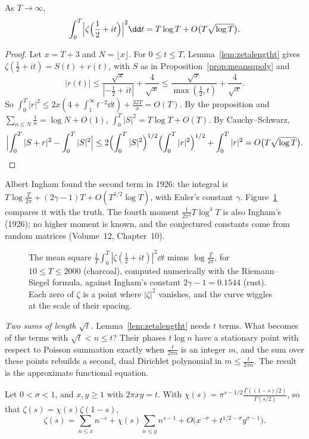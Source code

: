 \begin{theorem}\label{thm:hardylittlewood}
As $T\to\infty$,
\[
\int_0^T\Bigl|\zeta\Bigl(\frac12+it\Bigr)\Bigr|^2\dd t=T\log T+O\bigl(T\sqrt{\log T}\bigr).
\]
\end{theorem}
\begin{proof}
Let $x=T+3$ and $N=\lfloor x\rfloor$. For $0\le t\le T$, Lemma~\ref{lem:zetalengtht} gives $\zeta(\frac12+it)=S(t)+r(t)$, with $S$ as in Proposition~\ref{prop:meansqpoly} and
\[
|r(t)|\le\frac{\sqrt x}{|{-\frac12}+it|}+\frac4{\sqrt x}\le\frac{\sqrt x}{\max(\frac12,t)}+\frac4{\sqrt x}.
\]
So $\int_0^T|r|^2\le2x(4+\int_1^\infty t^{-2}\dd t)+\frac{32T}x=O(T)$. By the proposition and $\sum_{n\le N}\frac1n=\log N+O(1)$, $\int_0^T|S|^2=T\log T+O(T)$. By Cauchy--Schwarz,
\[
\Bigl|\int_0^T|S+r|^2-\int_0^T|S|^2\Bigr|\le2\Bigl(\int_0^T|S|^2\Bigr)^{1/2}\Bigl(\int_0^T|r|^2\Bigr)^{1/2}+\int_0^T|r|^2=O\bigl(T\sqrt{\log T}\bigr).
\]
\end{proof}

Albert Ingham found the second term in 1926: the integral is $T\log\frac T{2\pi}+(2\gamma-1)T+O(T^{1/2}\log T)$, with Euler's constant $\gamma$. Figure~\ref{fig:meansq} compares it with the truth. The fourth moment $\frac1{2\pi^2}T\log^4T$ is also Ingham's (1926); no higher moment is known, and the conjectured constants come from random matrices (Volume~12, Chapter~10).

\begin{figure}[ht]
\centering
{}
\caption{The mean square $\frac1T\int_0^T|\zeta(\frac12+it)|^2\dd t$ minus $\log\frac T{2\pi}$, for $10\le T\le2000$ (charcoal), computed numerically with the Riemann--Siegel formula, against Ingham's constant $2\gamma-1=0.1544$ (rust). Each zero of $\zeta$ is a point where $|\zeta|^2$ vanishes, and the curve wiggles at the scale of their spacing.}
\label{fig:meansq}
\end{figure}

\emph{Two sums of length $\sqrt t$.} Lemma~\ref{lem:zetalengtht} needs $t$ terms. What becomes of the terms with $\sqrt t<n\le t$? Their phases $t\log n$ have a stationary point with respect to Poisson summation exactly when $\frac t{2\pi n}$ is an integer $m$, and the sum over these points rebuilds a second, dual Dirichlet polynomial in $m\le\frac t{2\pi n}$. The result is the approximate functional equation.

\begin{theorem}\label{thm:afe}
Let $0<\sigma<1$, and $x,y\ge1$ with $2\pi xy=t$. With $\chi(s)=\pi^{s-1/2}\frac{\Gamma((1-s)/2)}{\Gamma(s/2)}$, so that $\zeta(s)=\chi(s)\zeta(1-s)$,
\[
\zeta(s)=\sum_{n\le x}n^{-s}+\chi(s)\sum_{n\le y}n^{s-1}+O\bigl(x^{-\sigma}+t^{1/2-\sigma}y^{\sigma-1}\bigr).
\]
\end{theorem}

